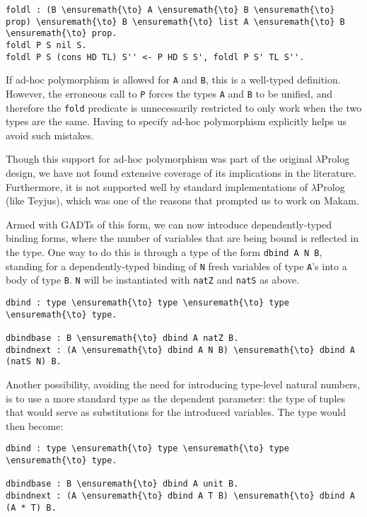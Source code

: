 \begin{verbatim}
foldl : (B \ensuremath{\to} A \ensuremath{\to} B \ensuremath{\to} prop) \ensuremath{\to} B \ensuremath{\to} list A \ensuremath{\to} B \ensuremath{\to} prop.
foldl P S nil S.
foldl P S (cons HD TL) S'' <- P HD S S', foldl P S' TL S''.
\end{verbatim}

If ad-hoc polymorphism is allowed for \texttt{A} and \texttt{B}, this is
a well-typed definition. However, the erroneous call to \texttt{P}
forces the types \texttt{A} and \texttt{B} to be unified, and therefore
the \texttt{fold} predicate is unnecessarily restricted to only work
when the two types are the same. Having to specify ad-hoc polymorphism
explicitly helps us avoid such mistakes.

Though this support for ad-hoc polymorphism was part of the original
\ensuremath{\lambda}Prolog design, we have not found extensive coverage of its implications
in the literature. Furthermore, it is not supported well by standard
implementations of \ensuremath{\lambda}Prolog (like Teyjus), which was one of the reasons
that prompted us to work on Makam.

Armed with GADTs of this form, we can now introduce dependently-typed
binding forms, where the number of variables that are being bound is
reflected in the type. One way to do this is through a type of the form
\texttt{dbind\ A\ N\ B}, standing for a dependently-typed binding of
\texttt{N} fresh variables of type \texttt{A}'s into a body of type
\texttt{B}. \texttt{N} will be instantiated with \texttt{natZ} and
\texttt{natS} as above.

\begin{verbatim}
dbind : type \ensuremath{\to} type \ensuremath{\to} type \ensuremath{\to} type. 

dbindbase : B \ensuremath{\to} dbind A natZ B.
dbindnext : (A \ensuremath{\to} dbind A N B) \ensuremath{\to} dbind A (natS N) B.
\end{verbatim}

Another possibility, avoiding the need for introducing type-level
natural numbers, is to use a more standard type as the dependent
parameter: the type of tuples that would serve as substitutions for the
introduced variables. The type would then become:

\begin{verbatim}
dbind : type \ensuremath{\to} type \ensuremath{\to} type \ensuremath{\to} type.

dbindbase : B \ensuremath{\to} dbind A unit B.
dbindnext : (A \ensuremath{\to} dbind A T B) \ensuremath{\to} dbind A (A * T) B.
\end{verbatim}

